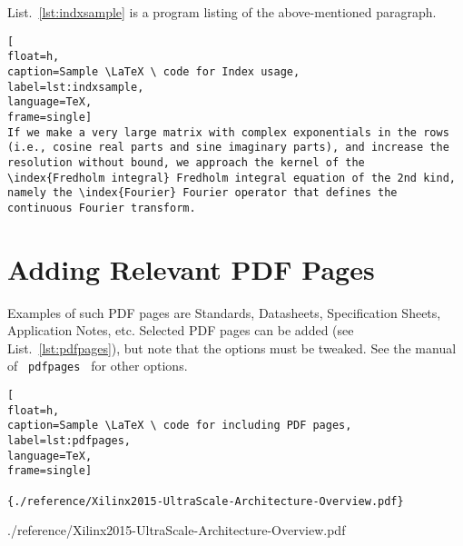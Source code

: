 List.~\ref{lst:indxsample} is a program listing of the above-mentioned paragraph.

\begin{lstlisting}[
float=h,
caption=Sample \LaTeX \ code for Index usage, 
label=lst:indxsample,
language=TeX,
frame=single]
If we make a very large matrix with complex exponentials in the rows (i.e., cosine real parts and sine imaginary parts), and increase the resolution without bound, we approach the kernel of the \index{Fredholm integral} Fredholm integral equation of the 2nd kind, namely the \index{Fourier} Fourier operator that defines the continuous Fourier transform.
\end{lstlisting}
\cleardoublepage




\newpage
\section*{Adding Relevant PDF Pages}

Examples of such PDF pages are Standards, Datasheets, Specification Sheets, Application Notes, etc.  Selected PDF pages can be added (see List.~\ref{lst:pdfpages}), but note that the options must be tweaked.  See the manual of \verb| pdfpages | for other options. 

\begin{lstlisting}[
float=h,
caption=Sample \LaTeX \ code for including PDF pages, 
label=lst:pdfpages,
language=TeX,
frame=single]

{./reference/Xilinx2015-UltraScale-Architecture-Overview.pdf}
\end{lstlisting}
\cleardoublepage


{./reference/Xilinx2015-UltraScale-Architecture-Overview.pdf}